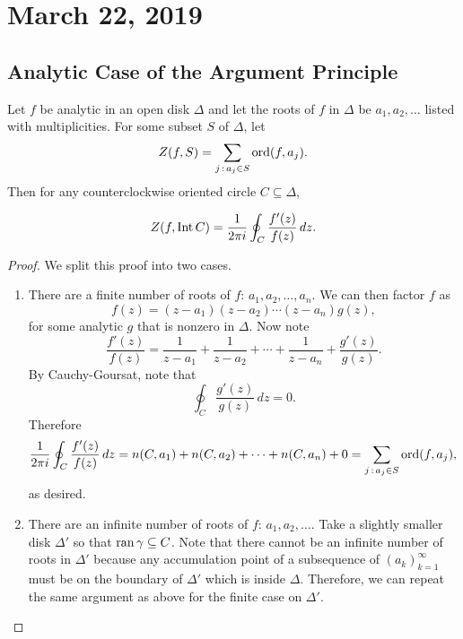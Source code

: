\section{March 22, 2019}

\subsection{Analytic Case of the Argument Principle}

\begin{theorem}
    Let $f$ be analytic in an open disk $\Delta$ and let the
    roots of $f$ in $\Delta$ be $a_1, a_2, \ldots$ listed
    with multiplicities.
    For some subset $S$ of $\Delta$, let
    \[ Z(f, S) = \sum_{j \, : \, a_j \in S} \operatorname{ord} (f, a_j). \]
    Then for any counterclockwise oriented circle $C \subseteq
    \Delta$,

    \[ Z(f, \operatorname{Int}{C}) = \frac{1}{2\pi i} \oint_C \frac{f'(z)}{f(z)} \, dz. \]
\end{theorem}

\begin{proof}
    We split this proof into two cases.
    \begin{enumerate}
        \item There are a finite number of roots of $f$:
            $a_1, a_2, \ldots, a_n$.
            We can then factor $f$ as
            \[ f(z) = (z-a_1)(z-a_2) \cdots (z-a_n)g(z), \]
            for some analytic $g$ that is nonzero in $\Delta$.
            Now note
            \[ \frac{f'(z)}{f(z)} = \frac{1}{z - a_1} + 
                \frac{1}{z-a_2} + \cdots + \frac{1}{z-a_n} + 
                \frac{g'(z)}{g(z)}.
            \]
            By Cauchy-Goursat, note that
            \[ \oint_C \frac{g'(z)}{g(z)} \, dz = 0.\]
            Therefore
            \[ \frac{1}{2\pi i} \oint_C \frac{f'(z)}{f(z)} \, dz
                = n(C, a_1) + n(C, a_2) + \cdots + n(C, a_n) 
                + 0
                =\sum_{j \, : \, a_j \in S} \operatorname{ord} (f, a_j) ,
            \]
            as desired.

        \item There are an infinite number of roots of $f$:
            $a_1, a_2, \ldots$.
            Take a slightly smaller disk $\Delta'$ so that
            $\operatorname{ran} \gamma \subseteq C$.
            Note that there cannot be an infinite
            number of roots in $\Delta'$ because any
            accumulation point of a subsequence of ${(a_k)}_{k=1}^{\infty}$
            must be on the boundary of $\Delta'$ which is inside
            $\Delta$.
            Therefore, we can repeat the same argument as above
            for the finite case on $\Delta'$.
    \end{enumerate}
\end{proof}

